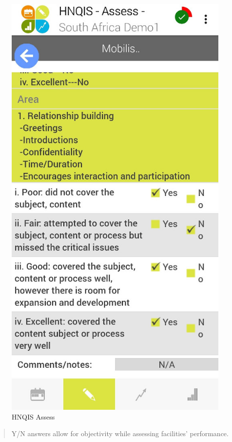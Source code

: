 \documentclass[]{book}
\begin{document}
\begin{figure}
\centering
\includegraphics{images/hnqis-assess.jpg}
\caption{HNQIS Assess}
\end{figure}

\begin{quote}
Y/N answers allow for objectivity while assessing facilities' performance.
\end{quote}
\end{document}
